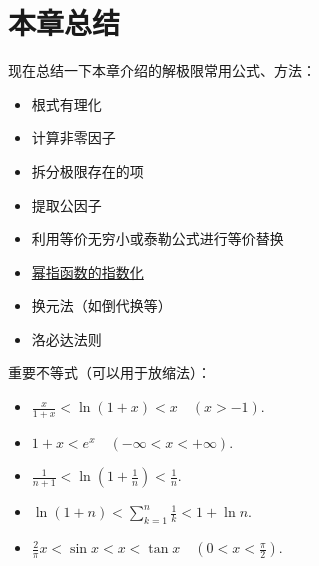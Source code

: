 \section{本章总结}
现在总结一下本章介绍的解极限常用公式、方法：
\begin{itemize}
	\item 根式有理化
	\item 计算非零因子
	\item 拆分极限存在的项
	\item 提取公因子
	\item 利用等价无穷小或泰勒公式进行等价替换
	\item \hyperref[theorem:幂指函数.幂指函数的极限]{幂指函数的指数化}
	\item 换元法（如倒代换等）
	\item 洛必达法则
\end{itemize}

重要不等式（可以用于放缩法）：
\begin{itemize}
	\item \(\frac{x}{1+x} < \ln(1+x) < x \quad(x>-1)\).%
	\item \(1+x < e^x \quad(-\infty<x<+\infty)\).
	\item \(\frac1{n+1} < \ln(1+\frac1n) < \frac1n\).
	\item \(\ln(1+n) < \sum_{k=1}^n \frac1{k} < 1 + \ln n\).
	\item \(\frac2\pi x < \sin x < x < \tan x \quad(0<x<\frac\pi2)\).
\end{itemize}


